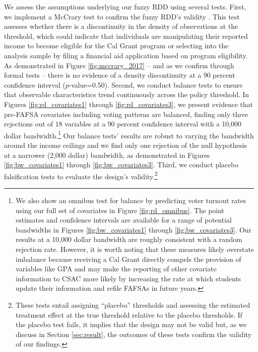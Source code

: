 \documentclass[12pt,letterpaper,oneside]{book}
\begin{document}
We assess the assumptions underlying our fuzzy RDD using several tests. First, we implement a McCrary test to confirm the fuzzy RDD's validity \citep{mccrary_manipulation_2008,cattaneo_manipulation_2018}. This test assesses whether there is a discontinuity in the density of observations at the threshold, which could indicate that individuals are manipulating their reported income to become eligible for the Cal Grant program or selecting into the analysis sample by filing a financial aid application based on program eligibility. As demonstrated in Figure \ref{fig:mccrary_2017} -- and as we confirm through formal tests -- there is no evidence of a density discontinuity at a 90 percent confidence interval ($p$-value=0.50). Second, we conduct balance tests to ensure that observable characteristics trend continuously across the policy threshold. In Figures \ref{fig:rd_covariates1} through \ref{fig:rd_covariates3}, we present evidence that pre-FAFSA covariates including voting patterns are balanced, finding only three rejections out of 18 variables at a 90 percent confidence interval with a 10,000 dollar bandwidth.\footnote{We also show an omnibus test for balance by predicting voter turnout rates using our full set of covariates in Figure \ref{fig:rd_omnibus}. The point estimates and confidence intervals are available for a range of potential bandwidths in Figures \ref{fig:bw_covariates1} through \ref{fig:bw_covariates3}. Our results at a 10,000 dollar bandwidth are roughly consistent with a random rejection rate. However, it is worth noting that these measures likely overstate imbalance because receiving a Cal Grant directly compels the provision of variables like GPA and may make the reporting of other covariate information to CSAC more likely by increasing the rate at which students update their information and refile FAFSAs in future years.} Our balance tests' results are robust to varying the bandwidth around the income ceilings and we find only one rejection of the null hypothesis at a narrower (2,000 dollar) bandwidth, as demonstrated in Figures \ref{fig:bw_covariates1} through \ref{fig:bw_covariates3}. Third, we conduct placebo falsification tests to evaluate the design's validity.\footnote{These tests entail assigning ``placebo'' thresholds and assessing the estimated treatment effect at the true threshold relative to the placebo thresholds. If the placebo test fails, it implies that the design may not be valid but, as we discuss in Section \ref{sec:result}, the outcomes of these tests confirm the validity of our findings.}
\end{document}
